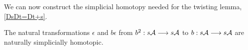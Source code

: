 \documentclass[11pt]{amsart}
\theoremstyle{plain}
\begin{document}
We can now construct the simplicial homotopy needed for the twisting lemma, \ref{DsDt=Dt+s}.
\begin{prop}\label{IteratedBarConstructionHomotopy}
The natural transformations $\epsilon$ and $b\epsilon$ from $b^2:s\mathcal{A}\longrightarrow s\mathcal{A}$ to $b:s\mathcal{A}\longrightarrow s\mathcal{A}$ are naturally simplicially homotopic.
\end{prop}
\end{document}

